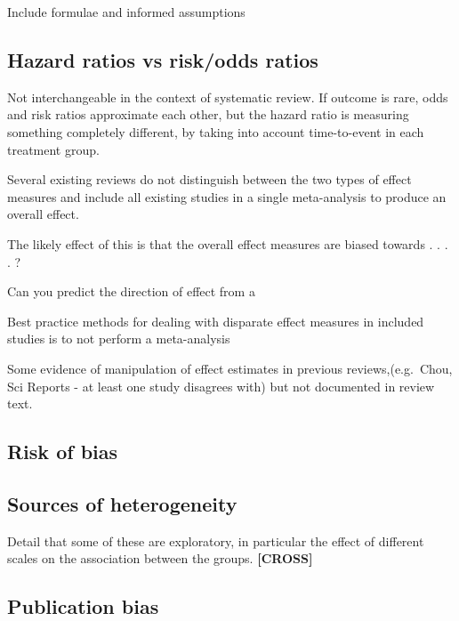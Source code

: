 \documentclass[a4paper, twoside]{templates/ociamthesis}
\begin{document}
Include formulae and informed assumptions

\hypertarget{hazard-ratios-vs-riskodds-ratios}{%
\subsection{Hazard ratios vs risk/odds ratios}\label{hazard-ratios-vs-riskodds-ratios}}

Not interchangeable in the context of systematic review. If outcome is rare, odds and risk ratios approximate each other, but the hazard ratio is measuring something completely different, by taking into account time-to-event in each treatment group.

Several existing reviews do not distinguish between the two types of effect measures and include all existing studies in a single meta-analysis to produce an overall effect.

The likely effect of this is that the overall effect measures are biased towards . . . . ?

Can you predict the direction of effect from a

Best practice methods for dealing with disparate effect measures in included studies is to not perform a meta-analysis

Some evidence of manipulation of effect estimates in previous reviews,(e.g.~Chou, Sci Reports - at least one study disagrees with) but not documented in review text.

\hypertarget{risk-of-bias-subheading}{%
\subsection{Risk of bias}\label{risk-of-bias-subheading}}

\hypertarget{sources-of-heterogeneity}{%
\subsection{Sources of heterogeneity}\label{sources-of-heterogeneity}}

Detail that some of these are exploratory, in particular the effect of different scales on the association between the groups. \textbf{{[}CROSS{]}}

\hypertarget{publication-bias}{%
\subsection{Publication bias}\label{publication-bias}}
\end{document}
